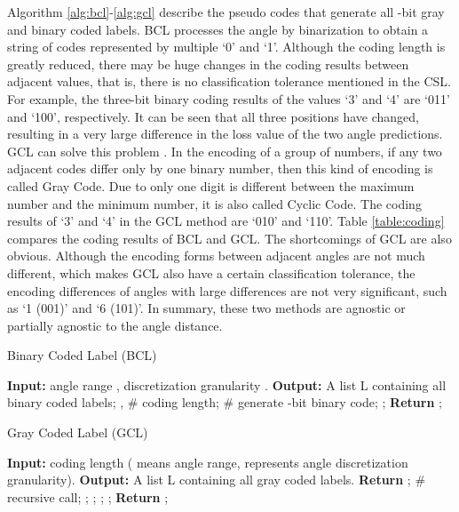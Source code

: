 \documentclass[final]{cvpr}
\begin{document}
Algorithm \ref{alg:bcl}-\ref{alg:gcl} describe the pseudo codes that generate all -bit gray and binary coded labels. BCL processes the angle by binarization to obtain a string of codes represented by multiple `0' and `1'. Although the coding length is greatly reduced, there may be huge changes in the coding results between adjacent values, that is, there is no classification tolerance mentioned in the CSL. For example, the three-bit binary coding results of the values `3' and `4' are `011' and `100', respectively. It can be seen that all three positions have changed, resulting in a very large difference in the loss value of the two angle predictions. GCL can solve this problem \cite{yang2020on}. In the encoding of a group of numbers, if any two adjacent codes differ only by one binary number, then this kind of encoding is called Gray Code. Due to only one digit is different between the maximum number and the minimum number, it is also called Cyclic Code. The coding results of `3' and `4' in the GCL method are `010' and `110'. Table \ref{table:coding} compares the coding results of BCL and GCL. The shortcomings of GCL are also obvious. Although the encoding forms between adjacent angles are not much different, which makes GCL also have a certain classification tolerance, the encoding differences of angles with large differences are not very significant, such as `1 (001)' and `6 (101)'. In summary, these two methods are agnostic or partially agnostic to the angle distance.

\begin{algorithm}[tb!]
  \caption{Binary Coded Label (BCL)}
  \label{alg:bcl}
  \begin{algorithmic}
  \STATE \textbf{Input:} angle range , discretization granularity .
  \STATE \textbf{Output:} A list L containing all binary coded labels;
  \STATE ,  \# coding length;
  \STATE  \# generate -bit binary code;
  \STATE ;
  \ENDFOR
  \STATE \textbf{Return} ;
  
  \end{algorithmic}
\end{algorithm}

\begin{algorithm}[tb!]
  \caption{Gray Coded Label (GCL)}
  \label{alg:gcl}
  \begin{algorithmic}
  \STATE \textbf{Input:} coding length  ( means angle range,  represents angle discretization granularity).
  \STATE \textbf{Output:} A list L containing all gray coded labels.
\IF{}
  \STATE \textbf{Return} ;
  \ELSE
  \STATE  \# recursive call;
  \STATE ;
  \STATE ;
  \ENDFOR
  \STATE ;
  \ENDFOR
  \STATE ;
  \ENDIF
  \STATE \textbf{Return} ;
  \end{algorithmic}
\end{algorithm}
\end{document}
